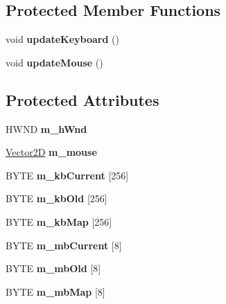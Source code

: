 \subsection*{Protected Member Functions}
\begin{DoxyCompactItemize}
\item 
\mbox{\label{class_input_a68a6f0cb5d643590f701309eb705f014}} 
void {\bfseries update\+Keyboard} ()
\item 
\mbox{\label{class_input_adc3eab48435d5539f9b5df9cc76521ff}} 
void {\bfseries update\+Mouse} ()
\end{DoxyCompactItemize}
\subsection*{Protected Attributes}
\begin{DoxyCompactItemize}
\item 
\mbox{\label{class_input_a4006b3ee24bf396c1e7ddbf9b46fed38}} 
H\+W\+ND {\bfseries m\+\_\+h\+Wnd}
\item 
\mbox{\label{class_input_a89fabc0e9eac0b1fb2c434a5eecca577}} 
\mbox{\hyperlink{class_vector2_d}{Vector2D}} {\bfseries m\+\_\+mouse}
\item 
\mbox{\label{class_input_a0b9dd453ade4923630e64172a0addb84}} 
B\+Y\+TE {\bfseries m\+\_\+kb\+Current} \mbox{[}256\mbox{]}
\item 
\mbox{\label{class_input_a4b6e76b91118e8138b31288ca24fa782}} 
B\+Y\+TE {\bfseries m\+\_\+kb\+Old} \mbox{[}256\mbox{]}
\item 
\mbox{\label{class_input_aba288f25dcbacc7db13813d6156d9435}} 
B\+Y\+TE {\bfseries m\+\_\+kb\+Map} \mbox{[}256\mbox{]}
\item 
\mbox{\label{class_input_aaba4d22a0a0a5be1562dd4af9c9900af}} 
B\+Y\+TE {\bfseries m\+\_\+mb\+Current} \mbox{[}8\mbox{]}
\item 
\mbox{\label{class_input_a5b48ec82d99725a784f7a7529d235bd2}} 
B\+Y\+TE {\bfseries m\+\_\+mb\+Old} \mbox{[}8\mbox{]}
\item 
\mbox{\label{class_input_aedf6e6b2ab598038d774de6b259fb6ec}} 
B\+Y\+TE {\bfseries m\+\_\+mb\+Map} \mbox{[}8\mbox{]}
\end{DoxyCompactItemize}


